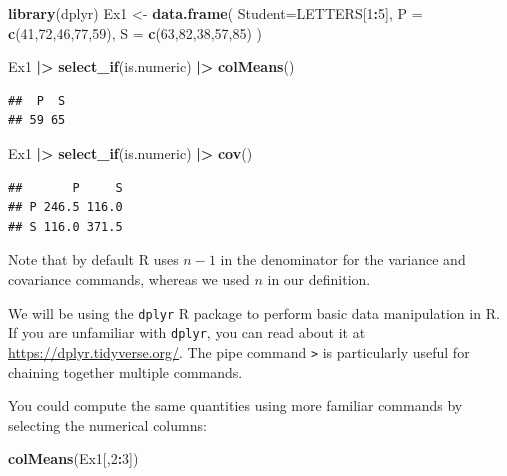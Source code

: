 \documentclass[
]{book}
\newenvironment{Shaded}{\begin{snugshade}}{\end{snugshade}}
\newcommand{\AttributeTok}[1]{\textcolor[rgb]{0.13,0.29,0.53}{#1}}
\newcommand{\DecValTok}[1]{\textcolor[rgb]{0.00,0.00,0.81}{#1}}
\newcommand{\FunctionTok}[1]{\textcolor[rgb]{0.13,0.29,0.53}{\textbf{#1}}}
\newcommand{\NormalTok}[1]{#1}
\newcommand{\OtherTok}[1]{\textcolor[rgb]{0.56,0.35,0.01}{#1}}
\newcommand{\SpecialCharTok}[1]{\textcolor[rgb]{0.81,0.36,0.00}{\textbf{#1}}}
\theoremstyle{definition}
\theoremstyle{definition}
\theoremstyle{definition}
\theoremstyle{definition}
\theoremstyle{remark}
\begin{document}
\begin{Shaded}
\begin{Highlighting}[]
\FunctionTok{library}\NormalTok{(dplyr)}
\NormalTok{Ex1 }\OtherTok{\textless{}{-}} \FunctionTok{data.frame}\NormalTok{(}
  \AttributeTok{Student=}\NormalTok{LETTERS[}\DecValTok{1}\SpecialCharTok{:}\DecValTok{5}\NormalTok{],}
  \AttributeTok{P =} \FunctionTok{c}\NormalTok{(}\DecValTok{41}\NormalTok{,}\DecValTok{72}\NormalTok{,}\DecValTok{46}\NormalTok{,}\DecValTok{77}\NormalTok{,}\DecValTok{59}\NormalTok{),}
  \AttributeTok{S =} \FunctionTok{c}\NormalTok{(}\DecValTok{63}\NormalTok{,}\DecValTok{82}\NormalTok{,}\DecValTok{38}\NormalTok{,}\DecValTok{57}\NormalTok{,}\DecValTok{85}\NormalTok{)}
\NormalTok{  )}

\NormalTok{Ex1 }\SpecialCharTok{|\textgreater{}} \FunctionTok{select\_if}\NormalTok{(is.numeric) }\SpecialCharTok{|\textgreater{}} \FunctionTok{colMeans}\NormalTok{()}
\end{Highlighting}
\end{Shaded}

\begin{verbatim}
##  P  S 
## 59 65
\end{verbatim}

\begin{Shaded}
\begin{Highlighting}[]
\NormalTok{Ex1 }\SpecialCharTok{|\textgreater{}} \FunctionTok{select\_if}\NormalTok{(is.numeric) }\SpecialCharTok{|\textgreater{}} \FunctionTok{cov}\NormalTok{()}
\end{Highlighting}
\end{Shaded}

\begin{verbatim}
##       P     S
## P 246.5 116.0
## S 116.0 371.5
\end{verbatim}

Note that by default R uses \(n-1\) in the denominator for the variance and covariance commands, whereas we used \(n\) in our definition.

We will be using the \texttt{dplyr} R package to perform basic data manipulation in R. If you are unfamiliar with \texttt{dplyr}, you can read about it at \url{https://dplyr.tidyverse.org/}. The pipe command \texttt{\textbar{}\textgreater{}} is particularly useful for chaining together multiple commands.

You could compute the same quantities using more familiar commands by selecting the numerical columns:

\begin{Shaded}
\begin{Highlighting}[]
\FunctionTok{colMeans}\NormalTok{(Ex1[,}\DecValTok{2}\SpecialCharTok{:}\DecValTok{3}\NormalTok{])}
\end{Highlighting}
\end{Shaded}
\end{document}
